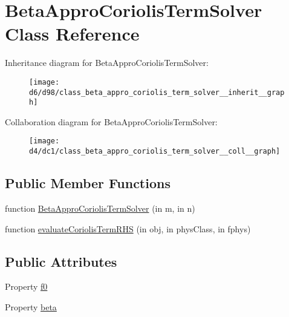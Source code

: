 \hypertarget{class_beta_appro_coriolis_term_solver}{}\section{Beta\+Appro\+Coriolis\+Term\+Solver Class Reference}
\label{class_beta_appro_coriolis_term_solver}


Inheritance diagram for Beta\+Appro\+Coriolis\+Term\+Solver\+:
\nopagebreak
\begin{figure}[H]
\begin{center}
\leavevmode
\texttt{[image: d6/d98/class\_beta\_appro\_coriolis\_term\_solver\_\_inherit\_\_graph]}
\end{center}
\end{figure}


Collaboration diagram for Beta\+Appro\+Coriolis\+Term\+Solver\+:
\nopagebreak
\begin{figure}[H]
\begin{center}
\leavevmode
\texttt{[image: d4/dc1/class\_beta\_appro\_coriolis\_term\_solver\_\_coll\_\_graph]}
\end{center}
\end{figure}
\subsection*{Public Member Functions}
\begin{DoxyCompactItemize}
\item 
function \hyperlink{class_beta_appro_coriolis_term_solver_ab715312f1484e8ca25adb128160757b0}{Beta\+Appro\+Coriolis\+Term\+Solver} (in m, in n)
\item 
function \hyperlink{class_beta_appro_coriolis_term_solver_a12dba775f42b7d63a209fab9f4c3c3c7}{evaluate\+Coriolis\+Term\+R\+HS} (in obj, in phys\+Class, in fphys)
\end{DoxyCompactItemize}
\subsection*{Public Attributes}
\begin{DoxyCompactItemize}
\item 
Property \hyperlink{class_beta_appro_coriolis_term_solver_a78d8ba5f989c047c9abf9f292df8411e}{f0}
\item 
Property \hyperlink{class_beta_appro_coriolis_term_solver_a417829f69185f320ccde4d4695a24366}{beta}
\end{DoxyCompactItemize}


